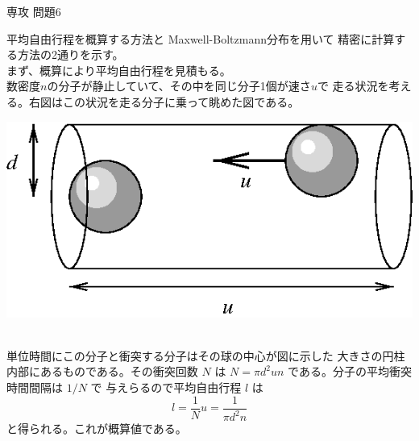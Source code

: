 \documentclass[fleqn]{jbook}
\begin{document}
\begin{answer}{専攻 問題6}{}
\begin{subanswers}
\SubAnswer
  \begin{subsubanswers}
  \SubSubAnswer
    \parbox[t]{80mm}{
    平均自由行程を概算する方法と Maxwell-Boltzmann分布を用いて
    精密に計算する方法の2通りを示す。\\
%
    まず、概算により平均自由行程を見積もる。\\
%
    数密度$n$の分子が静止していて、その中を同じ分子1個が速さ$u$で
    走る状況を考える。右図はこの状況を走る分子に乗って眺めた図である。
    }\parbox[t]{75mm}{\vspace*{-5mm}
    \begin{center}
      \mbox{\includegraphics[clip]{1995phy6-2.eps}}
    \end{center}}\\
%
    単位時間にこの分子と衝突する分子はその球の中心が図に示した
    大きさの円柱内部にあるものである。その衝突回数 $N$ は
    $N = \pi d^2 u n$ である。分子の平均衝突時間間隔は $1/N$ で
    与えらるので平均自由行程 $l$ は
%
    \[ l = \frac{1}{N}u = \frac{1}{\pi d^2 n} \]
%
    と得られる。これが概算値である。


\end{subsubanswers}
\end{subanswers}
\end{answer}
\end{document}
